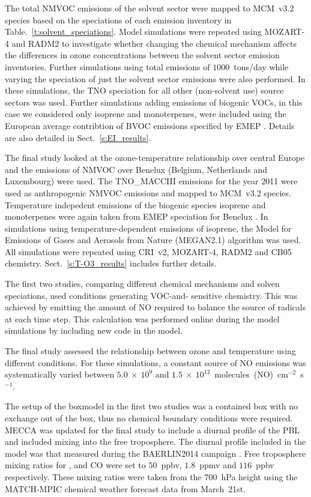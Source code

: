 The total NMVOC emissions of the solvent sector were mapped to MCM~v3.2 species based on the speciations of each emission inventory in Table.~\ref{t:solvent_speciations}.
Model simulations were repeated using MOZART-4 and RADM2 to investigate whether changing the chemical mechanism affects the differences in ozone concentrations between the solvent sector emission inventories.
Further simulations using total emissions of $1000$~tons/day while varying the speciation of just the solvent sector emissions were also performed.
In these simulations, the TNO speciation for all other (non-solvent use) source sectors was used.
Further simulations adding emissions of biogenic VOCs, in this case we considered only isoprene and monoterpenes, were included using the European average contribtion of BVOC emissions specified by EMEP \citep{Simpson:2012}.
Details are also detailed in Sect.~\ref{s:EI_results}.

The final study looked at the ozone-temperature relationship over central Europe and the emissions of NMVOC over Benelux (Belgium, Netherlands and Luxembourg) were used.
The TNO\_MACCIII emissions for the year 2011 were used as anthropogenic NMVOC emissions and mapped to MCM~v3.2 species.
Temperature indepedent emissions of the biogenic species isoprene and monoterpenes were again taken from EMEP speciation for Benelux \citep{Simpson:2012}.
In simulations using temperature-dependent emissions of isoprene, the Model for Emissions of Gases and Aerosols from Nature (MEGAN2.1) \citep{Guenther:2012} algorithm was used.
All simulations were repeated using CRI~v2, MOZART-4, RADM2 and CB05 chemistry.
Sect.~\ref{s:T-O3_results} includes further details.

The first two studies, comparing different chemical mechanisms and solven speciations, used  conditions generating VOC-and- sensitive chemistry.
This was achieved by emitting the amount of NO required to balance the source of radicals at each time step.
This calculation was performed online during the model simulations by including new code in the model.

The final study assessed the relationship between ozone and temperature using different  conditions.
For these simulations, a constant source of NO emissions was systematically varied between $5.0~\times~10^9$ and $1.5~\times~10^{12}$~molecules~(NO)~cm$^{-2}$~s$^{-1}$.

The setup of the boxmodel in the first two studies was a contained box with no exchange out of the box, thus no chemical boundary conditions were required.
MECCA was updated for the final study to include a diurnal profile of the PBL and included mixing into the free troposphere.
The diurnal profile included in the model was that measured during the BAERLIN2014 campaign \citep{Bonn:2016}.
Free troposphere mixing ratios for ,  and CO were set to $50$~ppbv, $1.8$~ppmv and $116$~ppbv respectively. 
These mixing ratios were taken from the $700$~hPa height using the MATCH-MPIC chemical weather forecast data from March~21st.

